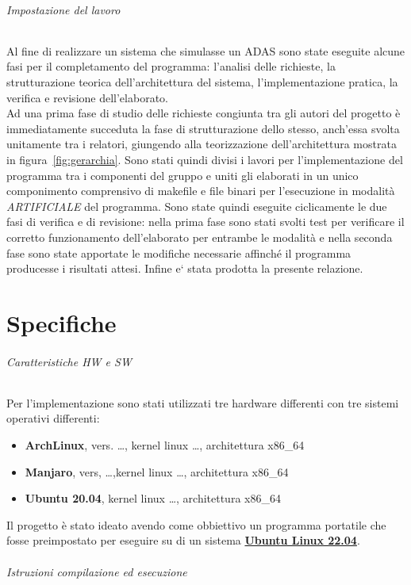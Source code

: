 \documentclass[11pt, openany]{article}
\theoremstyle{definition}
\theoremstyle{plain}
\theoremstyle{remark}
\begin{document}
		\paragraph{Impostazione del lavoro}
			Al fine di realizzare un sistema che simulasse un ADAS sono state eseguite alcune fasi per il completamento del programma: l'analisi delle richieste, la strutturazione teorica dell'architettura del sistema, l'implementazione pratica, la verifica e revisione dell'elaborato.\\
			Ad una prima fase di studio delle richieste congiunta tra gli autori del progetto è immediatamente succeduta la fase di strutturazione dello stesso, anch'essa svolta unitamente tra i relatori, giungendo alla teorizzazione dell'architettura mostrata in figura~\ref{fig:gerarchia}. Sono stati quindi divisi i lavori per l'implementazione del programma tra i componenti del gruppo e uniti gli elaborati in un unico componimento comprensivo di makefile e file binari per l'esecuzione in modalità \textit{ARTIFICIALE} del programma. Sono state quindi eseguite ciclicamente le due fasi di verifica e di revisione: nella prima fase sono stati svolti test per verificare il corretto funzionamento dell'elaborato per entrambe le modalità e nella seconda fase sono state apportate le modifiche necessarie affinché il programma producesse i risultati attesi. Infine e` stata prodotta la presente relazione.
	\part{Specifiche}
		\paragraph{Caratteristiche HW e SW}
		Per l'implementazione sono stati utilizzati tre hardware differenti con tre sistemi operativi differenti:
		\begin{itemize}
			\item \textbf{ArchLinux}, vers. \dots, kernel linux \dots, architettura x86\_64
			\item \textbf{Manjaro}, vers, \dots,kernel linux \dots, architettura x86\_64
			\item \textbf{Ubuntu 20.04}, kernel linux \dots, architettura x86\_64
		\end{itemize}
		Il progetto è stato ideato avendo come obbiettivo un programma portatile che fosse preimpostato per eseguire su di un sistema \textbf{\underline{Ubuntu Linux 22.04}}.
		\paragraph{Istruzioni compilazione ed esecuzione}
\end{document}
